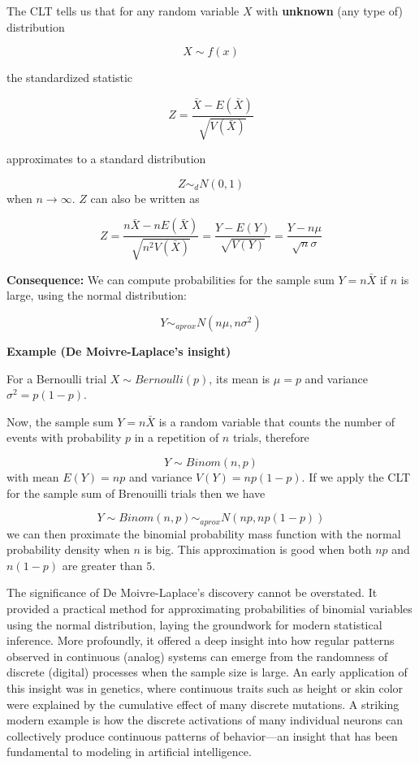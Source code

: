 \documentclass[
]{book}
\begin{document}
The CLT tells us that for any random variable \(X\) with \textbf{unknown} (any type of) distribution

\[X \sim f(x)\]

the standardized statistic

\[Z=\frac{\bar{X}-E(\bar{X})}{\sqrt{V(\bar{X})}}\]

approximates to a standard distribution

\[Z \sim_d N(0,1)\] when \(n\rightarrow \infty\). \(Z\) can also be written as

\[Z=\frac{n\bar{X}-nE(\bar{X})}{\sqrt{n^2V(\bar{X})}}=\frac{Y-E(Y)}{\sqrt{V(Y)}}=\frac{Y-n\mu}{\sqrt{n}\sigma}\]

\textbf{Consequence:} We can compute probabilities for the sample sum \(Y=n\bar{X}\) if \(n\) is large, using the normal distribution:

\[Y \sim_{aprox}  N(n\mu, n\sigma^2)\]

\textbf{Example (De Moivre-Laplace's insight)}

For a Bernoulli trial \(X \sim Bernoulli(p)\), its mean is \(\mu=p\) and variance \(\sigma^2=p(1-p)\).

Now, the sample sum \(Y=n\bar{X}\) is a random variable that counts the number of events with probability \(p\) in a repetition of \(n\) trials, therefore

\[Y \sim Binom(n, p)\]
with mean \(E(Y)=np\) and variance \(V(Y)=np(1-p)\). If we apply the CLT for the sample sum of Brenouilli trials then we have

\[Y \sim  Binom(n, p) \sim_{aprox}  N(np, np(1-p))\]
we can then proximate the binomial probability mass function with the normal probability density when \(n\) is big. This approximation is good when both \(np\) and \(n(1-p)\) are greater than \(5\).

The significance of De Moivre-Laplace's discovery cannot be overstated. It provided a practical method for approximating probabilities of binomial variables using the normal distribution, laying the groundwork for modern statistical inference. More profoundly, it offered a deep insight into how regular patterns observed in continuous (analog) systems can emerge from the randomness of discrete (digital) processes when the sample size is large. An early application of this insight was in genetics, where continuous traits such as height or skin color were explained by the cumulative effect of many discrete mutations. A striking modern example is how the discrete activations of many individual neurons can collectively produce continuous patterns of behavior---an insight that has been fundamental to modeling in artificial intelligence.
\end{document}
